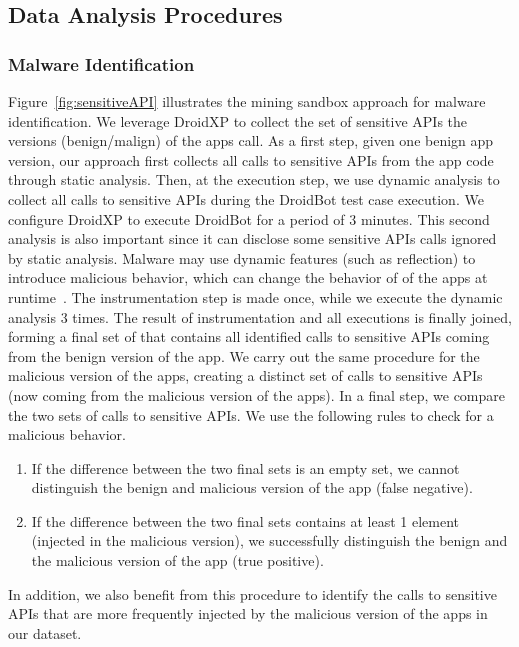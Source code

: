 \subsection{Data Analysis Procedures} \label{sec:dataAnalysisProc}

\subsubsection{Malware Identification} \label{sec:malwaresetup}
Figure~\ref{fig:sensitiveAPI} illustrates the mining sandbox approach for
malware identification. We leverage DroidXP to collect the set of sensitive APIs the versions (benign/malign) of the apps call. As a first step, given one benign app version,
our approach first collects all calls to sensitive APIs from the app code through static analysis. Then, at the execution step,
we use dynamic analysis to collect all calls to sensitive APIs during the DroidBot test case execution. We configure DroidXP to execute DroidBot for a
period of $3$ minutes. This second analysis is also important since it can disclose some sensitive APIs calls ignored by static analysis.
Malware may use dynamic features (such as reflection) to introduce malicious behavior, which can change the behavior of of the apps at runtime~\cite{DBLP:journals/spe/ZhangLTX18,DBLP:journals/tosem/LiTX19}.
The instrumentation step is made once, while we execute the dynamic analysis $3$ times. The result of instrumentation and all executions is finally joined,
forming a final set of that contains all identified calls to sensitive APIs coming from the benign version of the app. We carry out the same procedure for the malicious version of the apps,
creating a distinct set of calls to sensitive APIs (now coming from the malicious version of the apps). In
a final step, we compare the two sets of calls to sensitive APIs. We use the following rules to
check for a malicious behavior. 

\begin{enumerate}
    \item If the difference between the two final sets is an empty set, we cannot distinguish the benign and malicious version of the app (false negative).
    \item If the difference between the two final sets contains at least 1 element (injected in the malicious version), we successfully distinguish the benign and the malicious version of the app (true positive).
\end{enumerate}

In addition, we also benefit from this procedure to identify the calls to sensitive APIs that are more frequently injected by the malicious version of the apps
in our dataset. 

